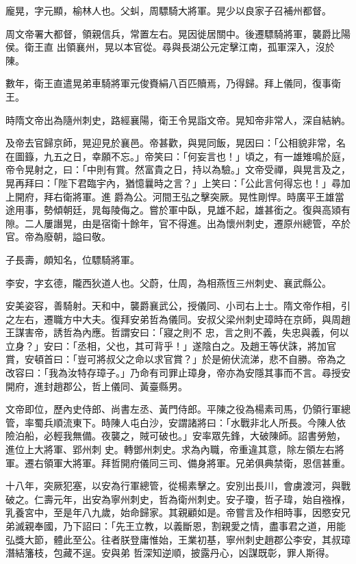 \begin{pinyinscope}
 龐晃，字元顯，榆林人也。父虯，周驃騎大將軍。晃少以良家子召補州都督。



 周文帝署大都督，領親信兵，常置左右。晃因徙居關中。後遷驃騎將軍，襲爵比陽侯。衛王直
 出領襄州，晃以本官從。尋與長湖公元定擊江南，孤軍深入，沒於陳。



 數年，衛王直遣晃弟車騎將軍元俊賚絹八百匹贖焉，乃得歸。拜上儀同，復事衛王。



 時隋文帝出為隨州刺史，路經襄陽，衛王令晃詣文帝。晃知帝非常人，深自結納。



 及帝去官歸京師，晃迎見於襄邑。帝甚歡，與晃同飯，晃因曰：「公相貌非常，名在圖籙，九五之日，幸願不忘。」帝笑曰：「何妄言也！」頃之，有一雄雉鳴於庭，帝令晃射之，曰：「中則有賞。然富貴之日，持以為驗。」文帝受禪，與晃言及之，晃再拜曰：「陛下君臨宇內，猶憶曩時之言？」上笑曰：「公此言何得忘也！」尋加上開府，拜右衛將軍。進
 爵為公。河間王弘之擊突厥。晃性剛悍。時廣平王雄當途用事，勢傾朝廷，晁每陵侮之。嘗於軍中臥，見雄不起，雄甚銜之。復與高熲有隙。二人屢譖晃，由是宿衛十餘年，官不得進。出為懷州刺史，遷原州總管，卒於官。帝為廢朝，謚曰敬。



 子長壽，頗知名，位驃騎將軍。



 李安，字玄德，隴西狄道人也。父蔚，仕周，為相燕恆三州刺史、襄武縣公。



 安美姿容，善騎射。天和中，襲爵襄武公，授儀同、小司右上士。隋文帝作相，引之左右，遷職方中大夫。復拜安弟哲為儀同。安叔父梁州刺史璋時在京師，與周趙王謀害帝，誘哲為內應。哲謂安曰：「寢之則不
 忠，言之則不義，失忠與義，何以立身？」安曰：「丞相，父也，其可背乎！」遂陰白之。及趙王等伏誅，將加官賞，安頓首曰：「豈可將叔父之命以求官賞？」於是俯伏流涕，悲不自勝。帝為之改容曰：「我為汝特存璋子。」乃命有司罪止璋身，帝亦為安隱其事而不言。尋授安開府，進封趙郡公，哲上儀同、黃臺縣男。



 文帝即位，歷內史侍郎、尚書左丞、黃門侍郎。平陳之役為楊素司馬，仍領行軍總管，率蜀兵順流東下。時陳人屯白沙，安謂諸將曰：「水戰非北人所長。今陳人依險泊船，必輕我無備。夜襲之，賊可破也。」安率眾先鋒，大破陳師。詔書勞勉，進位上大將軍、郢州刺
 史。轉鄧州刺史。求為內職，帝重違其意，除左領左右將軍。遷右領軍大將軍。拜哲開府儀同三司、備身將軍。兄弟俱典禁衛，恩信甚重。



 十八年，突厥犯塞，以安為行軍總管，從楊素擊之。安別出長川，會虜渡河，與戰破之。仁壽元年，出安為寧州刺史，哲為衛州刺史。安子瓊，哲子瑋，始自襁褓，乳養宮中，至是年八九歲，始命歸家。其親顧如是。帝嘗言及作相時事，因愍安兄弟滅親奉國，乃下詔曰：「先王立教，以義斷恩，割親愛之情，盡事君之道，用能弘獎大節，體此至公。往者朕登庸惟始，王業初基，寧州刺史趙郡公李安，其叔璋潛結籓枝，包藏不逞。安與弟
 哲深知逆順，披露丹心，凶謀既彰，罪人斯得。




\end{pinyinscope}
